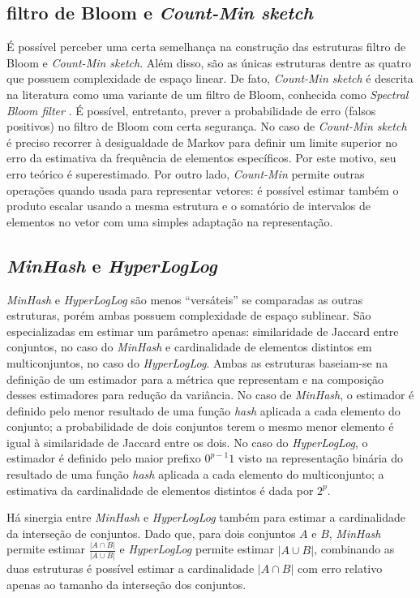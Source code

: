 \subsection{filtro de Bloom e \emph{Count-Min sketch}}

É possível perceber uma certa semelhança na construção das estruturas filtro de Bloom e \emph{Count-Min sketch}. Além disso, são as únicas estruturas dentre as quatro que possuem complexidade de espaço linear. De fato, \emph{Count-Min sketch} é descrita na literatura como uma variante de um filtro de Bloom, conhecida como \emph{Spectral Bloom filter} \cite{cohen2003spectral}. É possível, entretanto, prever a probabilidade de erro (falsos positivos) no filtro de Bloom com certa segurança. No caso de \emph{Count-Min sketch} é preciso recorrer à desigualdade de Markov para definir um limite superior no erro da estimativa da frequência de elementos específicos. Por este motivo, seu erro teórico é superestimado. Por outro lado, \emph{Count-Min} permite outras operações quando usada para representar vetores: é possível estimar também o produto escalar usando a mesma estrutura e o somatório de intervalos de elementos no vetor com uma simples adaptação na representação.

\subsection{\emph{MinHash} e \emph{HyperLogLog}}

\emph{MinHash} e \emph{HyperLogLog} são menos ``versáteis'' se comparadas as outras estruturas, porém ambas possuem complexidade de espaço sublinear. São especializadas em estimar um parâmetro apenas: similaridade de Jaccard entre conjuntos, no caso do \emph{MinHash} e cardinalidade de elementos distintos em multiconjuntos, no caso do \emph{HyperLogLog}. Ambas as estruturas baseiam-se na definição de um estimador para a métrica que representam e na composição desses estimadores para redução da variância. No caso de \emph{MinHash}, o estimador é definido pelo menor resultado de uma função \emph{hash} aplicada a cada elemento do conjunto; a probabilidade de dois conjuntos terem o mesmo menor elemento é igual à similaridade de Jaccard entre os dois. No caso do \emph{HyperLogLog}, o estimador é definido pelo maior prefixo $0^{p-1}1$ visto na representação binária do resultado de uma função \emph{hash} aplicada a cada elemento do multiconjunto; a estimativa da cardinalidade de elementos distintos é dada por $2^p$.

Há sinergia entre \emph{MinHash} e \emph{HyperLogLog} também para estimar a cardinalidade da interseção de conjuntos. Dado que, para dois conjuntos $A$ e $B$, \emph{MinHash} permite estimar $\frac{|A \cap B|}{|A \cup B|}$ e \emph{HyperLogLog} permite estimar $|A \cup B|$, combinando as duas estruturas é possível estimar a cardinalidade $|A \cap B|$ com erro relativo apenas ao tamanho da interseção dos conjuntos.